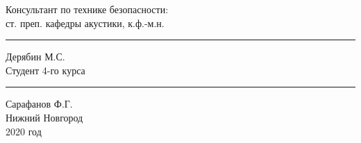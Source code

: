 \begin{titlepage}
\begin{spacing}{1}
	Консультант по технике безопасности:\\[0.4em]
	ст. преп. кафедры акустики, к.ф.-м.н.\hfill \rule{2cm}{1pt} Дерябин М.С.\hphantom{aa,}\\[15pt]
	Студент 4-го курса \hfill \rule{2cm}{1pt} Сарафанов Ф.Г.\hphantom{\,\,}\\[15pt]
	\vfill
	\centering
	Нижний Новгород\\[0.4em]
	2020 год
\end{spacing}
\end{titlepage}
\clearpage
\restoregeometry

